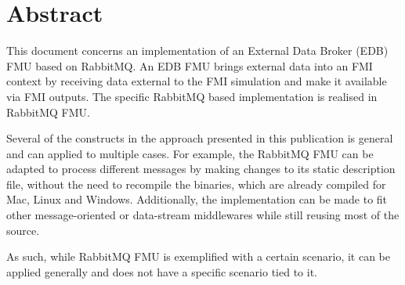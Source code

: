 \documentclass[a4paper,12pt,final]{include/intocpsassociation}   %
\newenvironment{assumption}{\noindent\smallskip\color{blue}\begin{framed}\begin{minipage}{0.95\columnwidth}}{\end{minipage}\end{framed}\smallskip\par}
\begin{document}
\maketitle
%
%
%
\section*{Abstract}
\label{sec:abstract}
%
This document concerns an implementation of an External Data Broker (EDB) FMU based on
RabbitMQ. An EDB FMU brings external data into an FMI context by receiving data
external to the FMI simulation and make it available via FMI outputs. The
specific RabbitMQ based implementation is realised in RabbitMQ FMU.

Several of the constructs in the approach presented in this publication is general and can applied to multiple
cases. For example, the RabbitMQ FMU can be adapted to process different messages by
making changes to its static description file, without the need to recompile the
binaries, which are already compiled for Mac, Linux and Windows. Additionally, the implementation can be made to fit other message-oriented or
data-stream middlewares while still reusing most of the source.

As such, while RabbitMQ FMU is exemplified with a certain scenario, it can be applied generally and does not have a specific
scenario tied to it.


%
\newpage
%
\tableofcontents
\newpage
%
%
%
%
%
%

\newpage

\newpage

\clearpage

\clearpage

\clearpage

\clearpage

%
%
%
%


\label{ch:bib} %
%
%
%
\clearpage
%
%
%
\appendix

\clearpage
%
%
%
\end{document}
